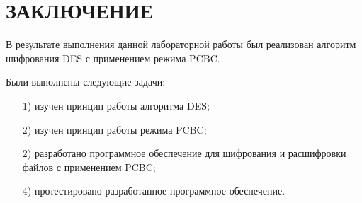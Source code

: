 \documentclass{bmstu}
\begin{document}
{\centering \chapter*{ЗАКЛЮЧЕНИЕ}}

В результате выполнения данной лабораторной работы был реализован алгоритм шифрования DES с применением режима PCBC.

Были выполнены следующие задачи:
\begin{enumerate}
\item[1)] изучен принцип работы алгоритма DES;
\item[2)] изучен принцип работы режима PCBC;
\item[2)] разработано программное обеспечение для шифрования и расшифровки файлов с применением PCBC;
\item[4)] протестировано разработанное программное обеспечение.
\end{enumerate}

{\centering \printbibliography[title=СПИСОК ИСПОЛЬЗОВАННЫХ ИСТОЧНИКОВ,heading=bibintoc]}
\end{document}
